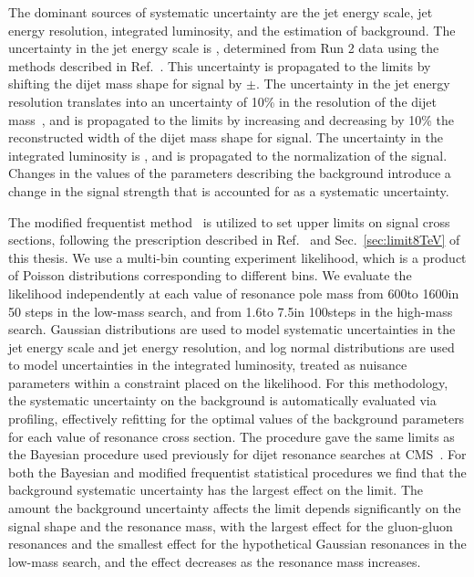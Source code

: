 The dominant sources of systematic uncertainty are the jet energy scale, jet energy resolution,
integrated luminosity, and the estimation of background. The uncertainty in the jet energy scale is \jecUncert,
determined from Run 2 data using the methods described in Ref.~\cite{Chatrchyan:2011ds}.
This uncertainty is propagated to the limits by shifting the dijet mass shape for signal by $\pm$\jecUncert.
The uncertainty in the jet energy
resolution translates into an uncertainty of 10\% in the resolution of the dijet
mass~\cite{Chatrchyan:2011ds}, and is propagated to the limits by increasing and decreasing by 10\% the reconstructed
width of the dijet mass shape for signal.
The uncertainty in the
integrated luminosity is \lumiUncert, and is propagated to the normalization of
the signal.
Changes in the values of the parameters describing the background introduce a change in the signal strength
that is accounted for as a systematic uncertainty.


The modified frequentist method~\cite{Junk1999,bib-cls} is
utilized to set upper limits on signal cross sections, following the prescription
described in Ref.~\cite{LHCCLs} and Sec.~\ref{sec:limit8TeV} of this thesis.  We use a multi-bin counting experiment likelihood, which is
a product of Poisson distributions corresponding to different bins.
We evaluate the likelihood independently at each value of resonance pole mass from 600\GeV to 1600\GeV in 50\GeV 
steps in the low-mass search, and from 1.6\TeV to 7.5\TeV in 100\GeV steps in the high-mass search. 
Gaussian distributions are used to model systematic uncertainties in the jet energy scale and jet energy
resolution, and log normal distributions are used to model uncertainties in the integrated luminosity, treated as nuisance 
parameters within a constraint placed on the likelihood. For this methodology, the 
systematic uncertainty on the background is automatically evaluated via profiling, effectively 
refitting for the optimal values of the background parameters for each value of resonance cross section.
The procedure gave the same limits as the Bayesian procedure used previously for dijet resonance
searches at CMS~\cite{Khachatryan:2015sja}. For both the Bayesian and modified frequentist statistical procedures 
we find that the background systematic uncertainty has the largest effect on the limit. The amount the
background uncertainty affects the limit depends significantly on the signal shape and the resonance mass, with the largest effect for
the gluon-gluon resonances and the smallest effect for the hypothetical Gaussian resonances in the low-mass search,
and the effect decreases as the resonance mass increases. %


